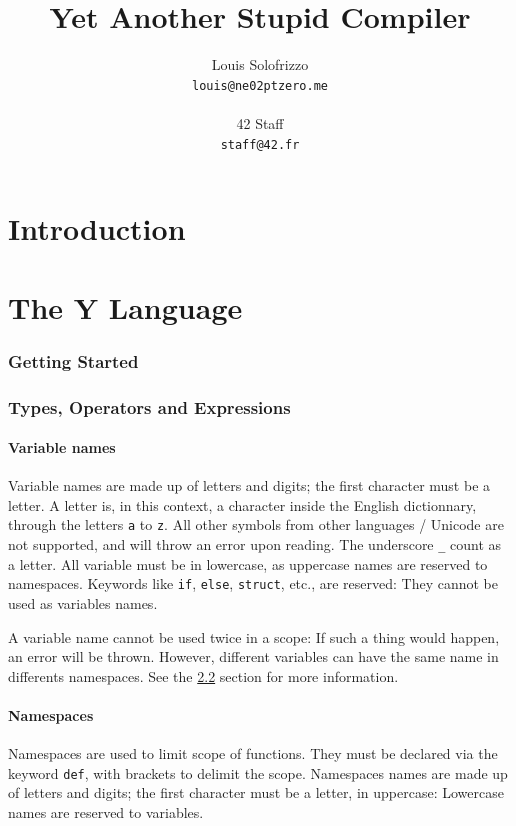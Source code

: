 \documentclass{scrartcl}
\title{Yet Another Stupid Compiler}
\author{
    Louis Solofrizzo\\
    \texttt{louis@ne02ptzero.me}\\
    \\
    42 Staff\\
    \texttt{staff@42.fr}
}
\begin{document}
\begin{titlingpage}
    \maketitle
\end{titlingpage}


    \tableofcontents{}
    \newpage

\part{Introduction}
\part{The Y Language}
    \section{Getting Started}
    \section{Types, Operators and Expressions}
        \subsection{Variable names} \label{varnames}
            Variable names are made up of letters and digits; the first character
            must be a letter. A letter is, in this context, a character inside
            the English dictionnary, through the letters \texttt{a} to \texttt{z}.
            All other symbols from other languages / Unicode are not supported,
            and will throw an error upon reading. The underscore \texttt{\_}
            count as a letter. All variable must be in lowercase, as uppercase
            names are reserved to namespaces.
            Keywords like \texttt{if}, \texttt{else}, \texttt{struct}, etc., are
            reserved: They cannot be used as variables names.

            A variable name cannot be used twice in a scope: If such a thing
            would happen, an error will be thrown. However, different variables
            can have the same name in differents namespaces. See the \ref{namespaces}
            section for more information.
        \subsection{Namespaces} \label{namespaces}
            Namespaces are used to limit scope of functions. They must be declared
            via the keyword \texttt{def}, with brackets to delimit the scope.
            Namespaces names are made up of letters and digits; the first character
            must be a letter, in uppercase: Lowercase names are reserved to variables.
\end{document}
